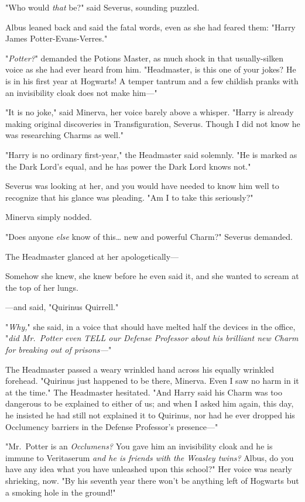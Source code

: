 "Who would \emph{that} be?" said Severus, sounding puzzled.

Albus leaned back and said the fatal words, even as she had feared them: "Harry 
James Potter-Evans-Verres."

"\emph{Potter?}" demanded the Potions Master, as much shock in that 
usually-silken voice as she had ever heard from him. "Headmaster, is this one 
of your jokes? He is in his first year at Hogwarts! A temper tantrum and a few 
childish pranks with an invisibility cloak does not make him---"

"It is no joke," said Minerva, her voice barely above a whisper. "Harry is 
already making original discoveries in Transfiguration, Severus. Though I did 
not know he was researching Charms as well."

"Harry is no ordinary first-year," the Headmaster said solemnly. "He is marked 
as the Dark Lord's equal, and he has power the Dark Lord knows not."

Severus was looking at her, and you would have needed to know him well to 
recognize that his glance was pleading. "Am I to take this seriously?"

Minerva simply nodded.

"Does anyone \emph{else} know of this{\ldots} new and powerful Charm?" Severus 
demanded.

The Headmaster glanced at her apologetically---

Somehow she knew, she knew before he even said it, and she wanted to scream at 
the top of her lungs.

---and said, "Quirinus Quirrell."

"\emph{Why,}" she said, in a voice that should have melted half the devices in 
the office, "\emph{did Mr.~Potter even TELL our Defense Professor about his 
brilliant new Charm for breaking out of prisons---}"

The Headmaster passed a weary wrinkled hand across his equally wrinkled 
forehead. "Quirinus just happened to be there, Minerva. Even I saw no harm in 
it at the time." The Headmaster hesitated. "And Harry said his Charm was too 
dangerous to be explained to either of us; and when I asked him again, this 
day, he insisted he had still not explained it to Quirinus, nor had he ever 
dropped his Occlumency barriers in the Defense Professor's presence---"

"Mr.~Potter is an \emph{Occlumens?} You gave him an invisibility cloak and he 
is immune to Veritaserum \emph{and he is friends with the Weasley twins?} 
Albus, do you have any idea what you have unleashed upon this school?" Her 
voice was nearly shrieking, now. "By his seventh year there won't be anything 
left of Hogwarts but a smoking hole in the ground!"

